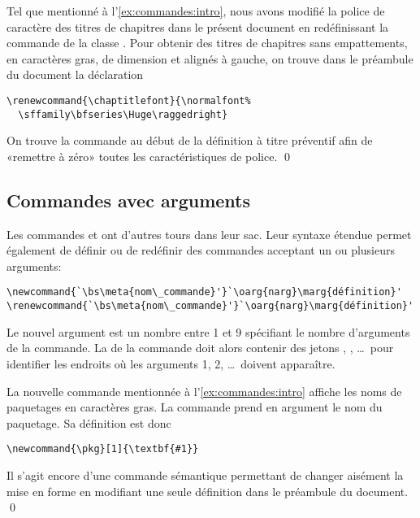 \begin{exemple}
  Tel que mentionné à l'\autoref{ex:commandes:intro}, nous avons
  modifié la police de caractère des titres de chapitres dans le présent
  document en redéfinissant la commande \cmdprint{\chaptitlefont} de
  la classe . Pour obtenir des titres de chapitres sans
  empattements, en caractères gras, de dimension \cmdprint{\Huge} et
  alignés à gauche, on trouve dans le préambule du document la
  déclaration
\begin{lstlisting}
\renewcommand{\chaptitlefont}{\normalfont%
  \sffamily\bfseries\Huge\raggedright}
\end{lstlisting}
  On trouve la commande \cmd{\normalfont} au début de la définition à
  titre préventif afin de «remettre à zéro» toutes les
  caractéristiques de police. %
  \qed
\end{exemple}


\subsection{Commandes avec arguments}
\label{sec:commandes:commandes:avec_arg}

Les commandes \cmdprint{\newcommand} et \cmdprint{\renewcommand} ont
d'autres tours dans leur sac. Leur syntaxe étendue permet également de
définir ou de redéfinir des commandes acceptant un ou plusieurs
arguments:
\begin{lstlisting}
\newcommand{`\bs\meta{nom\_commande}'}`\oarg{narg}\marg{définition}'
\renewcommand{`\bs\meta{nom\_commande}'}`\oarg{narg}\marg{définition}'
\end{lstlisting}
Le nouvel argument  est un nombre entre 1 et 9
spécifiant le nombre d'arguments de la commande. La 
de la commande doit alors contenir des jetons , ,
\dots\ pour identifier les endroits où les arguments 1, 2, \dots\
doivent apparaître.

\begin{exemple}
  La nouvelle commande \cmdprint{\pkg} mentionnée à
  l'\autoref{ex:commandes:intro} affiche les noms de paquetages en
  caractères gras. La commande prend en argument le nom du paquetage.
  Sa définition est donc
\begin{lstlisting}
\newcommand{\pkg}[1]{\textbf{#1}}
\end{lstlisting}
  Il s'agit encore d'une commande sémantique permettant de changer
  aisément la mise en forme en modifiant une seule définition dans le
  préambule du document. %
  \qed
\end{exemple}


